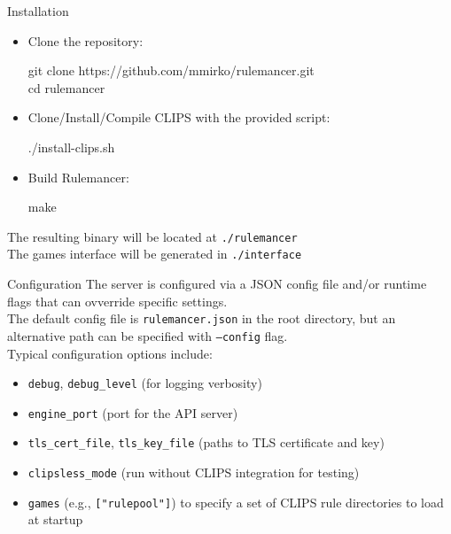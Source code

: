 \documentclass[aspectratio=169]{beamer}
\begin{document}
\begin{frame}{Installation}
\begin{itemize}
\item Clone the repository:
\begin{block}{

git clone https://github.com/mmirko/rulemancer.git \\
cd rulemancer

}
\end{block}
\vspace{0.3cm}
  \item Clone/Install/Compile CLIPS with the provided script:
\begin{block}{

./install-clips.sh
}
\end{block}
\vspace{0.3cm}
  \item Build Rulemancer:
\begin{block}{

  make
}
\end{block}
\end{itemize}
\vspace{0.3cm}
The resulting binary will be located at \texttt{./rulemancer} \\
The games interface will be generated in \texttt{./interface}
\end{frame}



\begin{frame}{Configuration}
The server is configured via a JSON config file and/or runtime flags that can ovverride specific settings. \\
\vspace{0.5cm}
The default config file is \texttt{rulemancer.json} in the root directory, but an alternative path can be specified 
with \texttt{--config} flag. \\
\vspace{0.5cm}
Typical configuration options include:
\begin{itemize}
    \item \texttt{debug}, \texttt{debug\_level} (for logging verbosity)
    \item \texttt{engine\_port} (port for the API server)
    \item \texttt{tls\_cert\_file}, \texttt{tls\_key\_file} (paths to TLS certificate and key)
    \item \texttt{clipsless\_mode} (run without CLIPS integration for testing)
    \item \texttt{games} (e.g., \texttt{["rulepool"]}) to specify a set of CLIPS rule directories to load at startup
  \end{itemize}
\end{frame}
\end{document}
